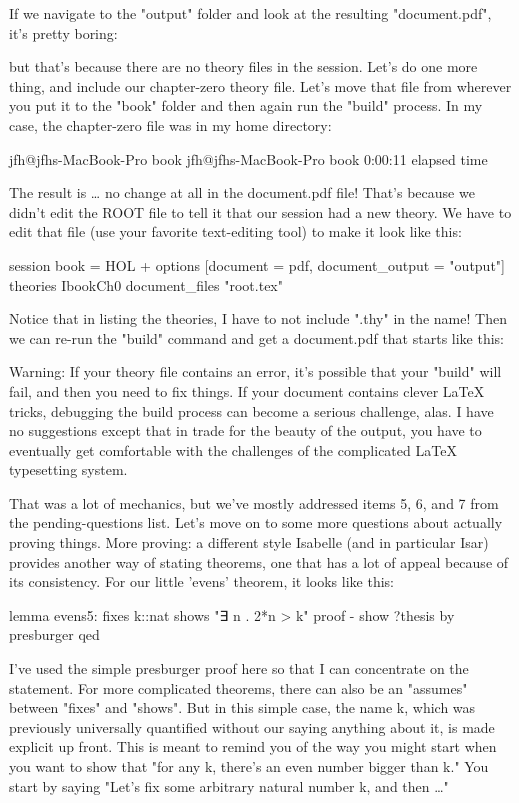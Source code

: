 If we navigate to the "output" folder and look at the resulting "document.pdf", it's pretty boring:


but that's because there are no theory files in the session. Let's do one more thing, and include our chapter-zero theory file. Let's move that file from wherever you put it to the "book" folder and then again run the "build" process. In my case, the chapter-zero file was in my home directory:

jfh@jfhs-MacBook-Pro book %
jfh@jfhs-MacBook-Pro book %
0:00:11 elapsed time

The result is … no change at all in the document.pdf file! That's because we didn't edit the ROOT file to tell it that our session had a new theory. We have to edit that file (use your favorite text-editing tool) to make it look like this:

session book = HOL +
  options [document = pdf, document_output = "output"]
  theories IbookCh0
  document_files
    "root.tex"

Notice that in listing the theories, I have to not include ".thy" in the name! 
Then we can re-run the "build" command and get a document.pdf that starts like this:




Warning: If your theory file contains an error, it's possible that your "build" will fail, and then you need to fix things. If your document contains clever LaTeX tricks, debugging the build process can become a serious challenge, alas. I have no suggestions except that in trade for the beauty of the output, you have to eventually get comfortable with the challenges of the complicated LaTeX typesetting system.

That was a lot of mechanics, but we've mostly addressed items 5, 6, and 7 from the pending-questions list. Let's move on to some more questions about actually proving things. 
More proving: a different style
Isabelle (and in particular Isar) provides another way of stating theorems, one that has a lot of appeal because of its consistency. For our little 'evens' theorem, it looks like this:

lemma evens5:
  fixes k::nat
  shows "∃ n . 2*n > k"
proof -
  show ?thesis by presburger
qed

I've used the simple presburger proof here so that I can concentrate on the statement. For more complicated theorems, there can also be an "assumes" between "fixes" and "shows". But in this simple case, the name k, which was previously universally quantified without our saying anything about it, is made explicit up front. This is meant to remind you of the way you might start when you want to show that "for any k, there's an even number bigger than k." You start by saying "Let's fix some arbitrary natural number k, and then …" 

